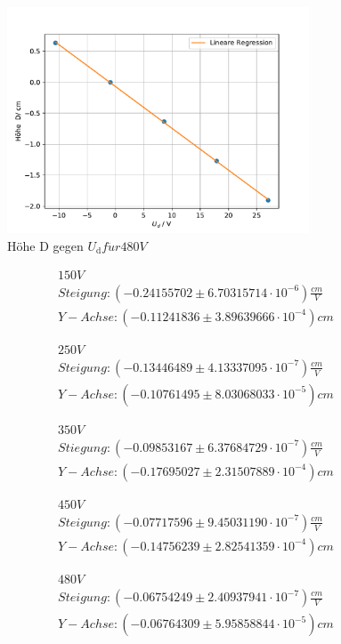 \begin{figure}[h!]
  \centering
  \includegraphics[width=0.8\textwidth]{480V.pdf}
  \caption{Höhe D gegen $U_{\text{d}}  f\ddot{u}r  480V$}
  \label{fig:480V}
\end{figure}
\begin{align*}
  150V\\
  Steigung:   (-0.24155702\pm6.70315714\cdot10^{-6})\si{\frac{cm}{V}}\\
  Y-Achse:    (-0.11241836\pm3.89639666\cdot10^{-4})\si{cm}
\end{align*}


\begin{align*}
  250V\\
  Steigung: (-0.13446489\pm4.13337095\cdot10^{-7})\si{\frac{cm}{V}}\\
  Y-Achse:  (-0.10761495\pm8.03068033\cdot10^{-5})\si{cm}
\end{align*}


\begin{align*}
350V\\
Stiegung: (-0.09853167\pm6.37684729\cdot10^{-7})\si{\frac{cm}{V}}\\
Y-Achse:  (-0.17695027\pm2.31507889\cdot10^{-4})\si{cm}
\end{align*}

\begin{align*}
450V\\
Steigung: (-0.07717596\pm9.45031190\cdot10^{-7})\si{\frac{cm}{V}}\\
Y-Achse:  (-0.14756239\pm2.82541359\cdot10^{-4})\si{cm}
\end{align*}

\begin{align*}
480V\\
Steigung: (-0.06754249\pm2.40937941\cdot10^{-7})\si{\frac{cm}{V}}\\
Y-Achse:  (-0.06764309\pm5.95858844\cdot10^{-5})\si{cm}
\end{align*}

